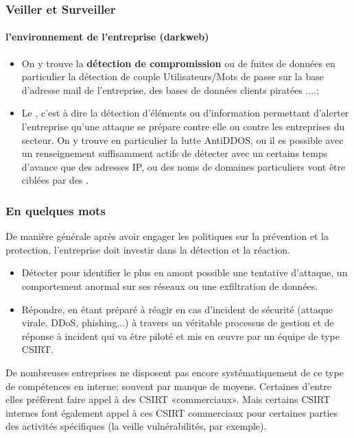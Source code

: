 \begin{frame}
\frametitle<presentation>{Veiller et Surveiller}
\framesubtitle<presentation>{l'environnement de l'entreprise (darkweb)}
\begin{itemize}
  \item On y trouve la\textbf{ détection de compromission} ou de fuites de données en particulier la détection de couple Utilisateurs/Mots de passe sur la base d'adresse mail de l'entreprise, des bases de données clients piratées ....;
  \item  Le\textbf{ }, c'est à dire la détection d'éléments ou d'information permettant d'alerter l'entreprise qu'une attaque se prépare contre elle ou contre les entreprises du secteur. On y trouve en particulier la lutte AntiDDOS, ou il es possible avec un renseignement suffisamment actifs de détecter avec un certains temps d'avance que des adresses IP, ou des noms de domaines particuliers vont être ciblées par des .
\end{itemize}
\end{frame}


\begin{frame}
\frametitle<presentation>{En quelques mots }
\end{frame}


De manière générale après avoir engager les politiques sur la prévention et la protection, l'entreprise doit investir dans la détection et la réaction. 
\begin{itemize}
  \item Détecter pour identifier le plus en amont possible une tentative d’attaque, un comportement anormal sur ses réseaux ou une exfiltration de données. 
  \item  Répondre, en étant préparé à réagir en cas d’incident de sécurité (attaque virale, DDoS, phishing...) à travers un véritable processus de gestion et de réponse à incident qui va être piloté et mis en œuvre par un équipe de type CSIRT.
\end{itemize}

De nombreuses entreprises ne disposent pas encore systématiquement de ce type de compétences en interne; souvent par manque de moyens. Certaines d’entre elles préfèrent faire appel à des CSIRT «commerciaux». Mais certains CSIRT internes font également appel à ces CSIRT commerciaux pour certaines parties des activités spécifiques (la veille vulnérabilités, par exemple).
